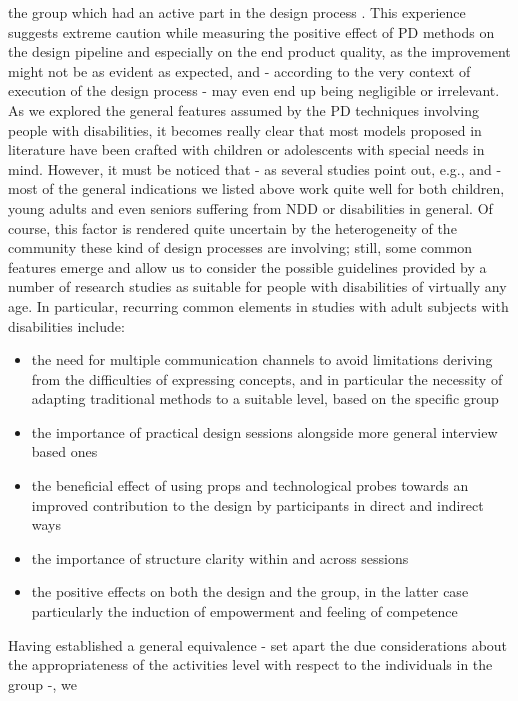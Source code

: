 the group which had an active part in the design process \cite{Benton2}. This experience suggests extreme caution while measuring the positive effect of PD methods on the design pipeline and especially on the end product quality, as the improvement might not be as evident as expected, and - according to the very context of execution of the design process - may even end up being negligible or irrelevant.\\

As we explored the general features assumed by the PD techniques involving people with
disabilities, it becomes really clear that most models proposed in literature have been
crafted with children or adolescents with special needs in mind. However, it must be noticed that - as several studies point out, e.g.\cite{Diciasette},\cite{Diciotto} and \cite{Diciannove} - most
of the general indications we listed above work quite well for both children, young adults
and even seniors suffering from NDD or disabilities in general. Of course, this factor is
rendered quite uncertain by the heterogeneity of the community these kind of design
processes are involving; still, some common features emerge and allow us to consider the
possible guidelines provided by a number of research studies as suitable for people with
disabilities of virtually any age. In particular, recurring common elements in studies with
adult subjects with disabilities include:
\begin{itemize}
\item the need for multiple communication channels to avoid limitations deriving from
the difficulties of expressing concepts, and in particular the necessity of adapting
traditional methods to a suitable level, based on the specific group
\item the importance of practical design sessions alongside more general interview based
ones
\item the beneficial effect of using props and technological probes towards an improved
contribution to the design by participants in direct and indirect ways
\item the importance of structure clarity within and across sessions
\item the positive effects on both the design and the group, in the latter case particularly
the induction of empowerment and feeling of competence
\end{itemize}
Having established a general equivalence - set apart the due considerations about the
appropriateness of the activities level with respect to the individuals in the group -, we
